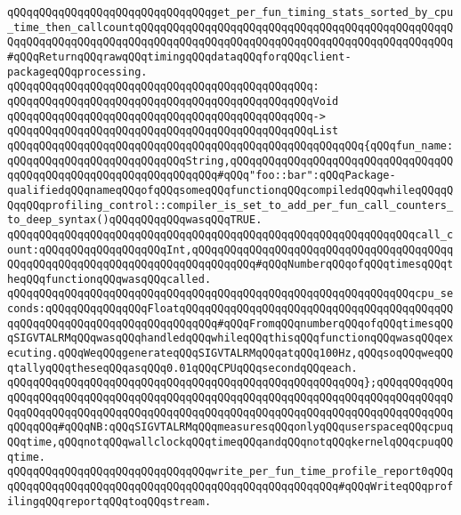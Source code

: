 \newline
\verb|qQQqqQQqqQQqqQQqqQQqqQQqqQQqqQQqget_per_fun_timing_stats_sorted_by_cpu_time_then_callcountqQQqqQQqqQQqqQQqqQQqqQQqqQQqqQQqqQQqqQQqqQQqqQQqqQQqqQQqqQQqqQQqqQQqqQQqqQQqqQQqqQQqqQQqqQQqqQQqqQQqqQQqqQQqqQQqqQQqqQQq#qQQqReturnqQQqrawqQQqtimingqQQqdataqQQqforqQQqclient-packageqQQqprocessing.|\newline
\verb|qQQqqQQqqQQqqQQqqQQqqQQqqQQqqQQqqQQqqQQqqQQqqQQq:|\newline
\verb|qQQqqQQqqQQqqQQqqQQqqQQqqQQqqQQqqQQqqQQqqQQqqQQqVoid|\newline
\verb|qQQqqQQqqQQqqQQqqQQqqQQqqQQqqQQqqQQqqQQqqQQqqQQq->|\newline
\verb|qQQqqQQqqQQqqQQqqQQqqQQqqQQqqQQqqQQqqQQqqQQqqQQqList|\newline
\verb|qQQqqQQqqQQqqQQqqQQqqQQqqQQqqQQqqQQqqQQqqQQqqQQqqQQqqQQq{qQQqfun_name:qQQqqQQqqQQqqQQqqQQqqQQqqQQqString,qQQqqQQqqQQqqQQqqQQqqQQqqQQqqQQqqQQqqQQqqQQqqQQqqQQqqQQqqQQqqQQqqQQq#qQQq"foo::bar":qQQqPackage-qualifiedqQQqnameqQQqofqQQqsomeqQQqfunctionqQQqcompiledqQQqwhileqQQqqQQqqQQqprofiling_control::compiler_is_set_to_add_per_fun_call_counters_to_deep_syntax()qQQqqQQqqQQqwasqQQqTRUE.|\newline
\verb|qQQqqQQqqQQqqQQqqQQqqQQqqQQqqQQqqQQqqQQqqQQqqQQqqQQqqQQqqQQqqQQqcall_count:qQQqqQQqqQQqqQQqqQQqInt,qQQqqQQqqQQqqQQqqQQqqQQqqQQqqQQqqQQqqQQqqQQqqQQqqQQqqQQqqQQqqQQqqQQqqQQqqQQqqQQq#qQQqNumberqQQqofqQQqtimesqQQqtheqQQqfunctionqQQqwasqQQqcalled.|\newline
\verb|qQQqqQQqqQQqqQQqqQQqqQQqqQQqqQQqqQQqqQQqqQQqqQQqqQQqqQQqqQQqqQQqcpu_seconds:qQQqqQQqqQQqqQQqFloatqQQqqQQqqQQqqQQqqQQqqQQqqQQqqQQqqQQqqQQqqQQqqQQqqQQqqQQqqQQqqQQqqQQqqQQqqQQq#qQQqFromqQQqnumberqQQqofqQQqtimesqQQqSIGVTALRMqQQqwasqQQqhandledqQQqwhileqQQqthisqQQqfunctionqQQqwasqQQqexecuting.qQQqWeqQQqgenerateqQQqSIGVTALRMqQQqatqQQq100Hz,qQQqsoqQQqweqQQqtallyqQQqtheseqQQqasqQQq0.01qQQqCPUqQQqsecondqQQqeach.|\newline
\verb|qQQqqQQqqQQqqQQqqQQqqQQqqQQqqQQqqQQqqQQqqQQqqQQqqQQqqQQq};qQQqqQQqqQQqqQQqqQQqqQQqqQQqqQQqqQQqqQQqqQQqqQQqqQQqqQQqqQQqqQQqqQQqqQQqqQQqqQQqqQQqqQQqqQQqqQQqqQQqqQQqqQQqqQQqqQQqqQQqqQQqqQQqqQQqqQQqqQQqqQQqqQQqqQQqqQQqqQQq#qQQqNB:qQQqSIGVTALRMqQQqmeasuresqQQqonlyqQQquserspaceqQQqcpuqQQqtime,qQQqnotqQQqwallclockqQQqtimeqQQqandqQQqnotqQQqkernelqQQqcpuqQQqtime.|\newline
\newline
\verb|qQQqqQQqqQQqqQQqqQQqqQQqqQQqqQQqwrite_per_fun_time_profile_report0qQQqqQQqqQQqqQQqqQQqqQQqqQQqqQQqqQQqqQQqqQQqqQQqqQQqqQQq#qQQqWriteqQQqprofilingqQQqreportqQQqtoqQQqstream.|\newline
